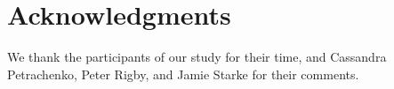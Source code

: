 \documentclass[10pt, conference, compsocconf]{IEEEtran}
\begin{document}

\section*{Acknowledgments}

We thank the participants of our study for their time, and Cassandra Petrachenko, Peter Rigby, and Jamie Starke for their comments.



\end{document}
